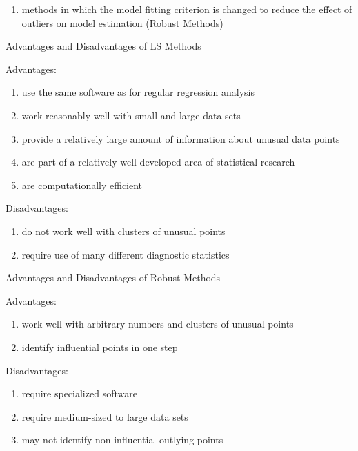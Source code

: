 {{\begin{enumerate}
to help determine their influence (LS Methods), and
\vspace{0.15in}
\item methods in which the model fitting criterion is changed to
reduce the effect of outliers on model estimation (Robust Methods)
\end{enumerate}
\newpage
\begin{center}
Advantages and Disadvantages of LS Methods
\end{center}
\vspace{0.5in}
Advantages: \\
\begin{enumerate}
\item use the same software as for regular regression analysis
\item work reasonably well with small and large data sets 
\item provide a relatively large amount of information about unusual data points 
\item are part of a relatively well-developed area of statistical research
\item are computationally efficient
\end{enumerate}
\vspace{0.5in}
Disadvantages: \\
\begin{enumerate}
\item do not work well with clusters of unusual points 
\item require use of many different diagnostic statistics
\end{enumerate}
\newpage
\begin{center}
Advantages and Disadvantages of Robust Methods
\end{center}
\vspace{0.5in}
Advantages: \\
\begin{enumerate}
\item work well with arbitrary numbers and clusters of unusual points 
\item identify influential points in one step 
\end{enumerate}
\vspace{0.5in}
Disadvantages: \\
\begin{enumerate}
\item require specialized software
\item require medium-sized to large data sets
\item may not identify non-influential outlying points

\end{enumerate}}}
